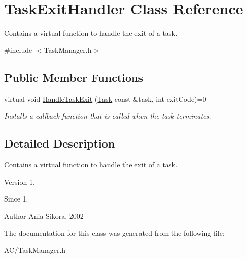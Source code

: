 \hypertarget{class_task_exit_handler}{\section{Task\-Exit\-Handler Class Reference}
\label{class_task_exit_handler}
}


Contains a virtual function to handle the exit of a task.  




{\ttfamily \#include $<$Task\-Manager.\-h$>$}

\subsection*{Public Member Functions}
\begin{DoxyCompactItemize}
\item 
\hypertarget{class_task_exit_handler_a3d715b69a8a5365980e30fbe3a05aa62}{virtual void \hyperlink{class_task_exit_handler_a3d715b69a8a5365980e30fbe3a05aa62}{Handle\-Task\-Exit} (\hyperlink{class_task}{Task} const \&task, int exit\-Code)=0}\label{class_task_exit_handler_a3d715b69a8a5365980e30fbe3a05aa62}

\begin{DoxyCompactList}\small\item\em Installs a callback function that is called when the task terminates. \end{DoxyCompactList}\end{DoxyCompactItemize}


\subsection{Detailed Description}
Contains a virtual function to handle the exit of a task. 

\begin{DoxyVersion}{Version}
1. 
\end{DoxyVersion}
\begin{DoxySince}{Since}
1. 
\end{DoxySince}
\begin{DoxyAuthor}{Author}
Ania Sikora, 2002 
\end{DoxyAuthor}


The documentation for this class was generated from the following file\-:\begin{DoxyCompactItemize}
\item 
A\-C/Task\-Manager.\-h\end{DoxyCompactItemize}
